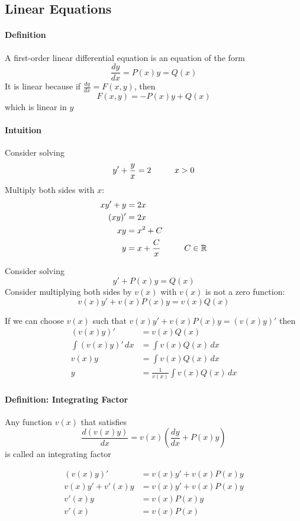 \documentclass[12pt]{article}
\newcommand\tab[1][1cm]{\hspace*{#1}}
\begin{document}
\subsection{Linear Equations}
\paragraph{Definition} A first-order linear differential equation is an equation of the form
\[
    \frac{dy}{dx} = P(x)y = Q(x)
\]
It is linear because if $\frac{dy}{dx} = F(x, y)$, then 
\[
    F(x, y) = - P(x)y + Q(x)
\]
which is linear in $y$

\paragraph{Intuition} Consider solving
\[
    y' + \frac{y}{x} = 2 \textrm{\tab} x > 0
\]
Multiply both sides with $x$:
\begin{align*} 
    xy' + y &= 2x \\
    (xy)' &= 2x \\
    xy &= x^2 + C \\
    y &= x + \frac{C}{x} \textrm{\tab} C \in \mathbb{R}
\end{align*}

\noindent
Consider solving
\[
    y' + P(x)y = Q(x)
\]
Consider multiplying both sides by $v(x)$ with $v(x)$ is not a zero function:
\[
    v(x)y' + v(x)P(x)y = v(x)Q(x)
\] 

\noindent
If we can choose $v(x)$ such that $v(x)y' + v(x)P(x)y = (v(x)y)'$ then 
\begin{align*} 
    (v(x)y)' &= v(x)Q(x) \\
    \int (v(x)y)' \, dx &= \int v(x)Q(x) \, dx\\
    v(x)y &= \int v(x)Q(x) \, dx \\
    y &= \frac{1}{v(x)} \int v(x)Q(x) \,dx
\end{align*}

\paragraph{Definition: Integrating Factor} Any function $v(x)$ that satisfies 
\[
    \frac{d(v(x)y)}{dx} = v(x) \left(\frac{dy}{dx} + P(x)y \right) 
\]
is called an integrating factor

\begin{align*} 
    (v(x)y)' &= v(x)y' + v(x)P(x)y \\
    v(x)y' + v'(x)y &= v(x)y' + v(x)P(x)y \\
    v'(x)y &= v(x)P(x)y \\
    v'(x) &= v(x)P(x)
\end{align*}
\end{document}
